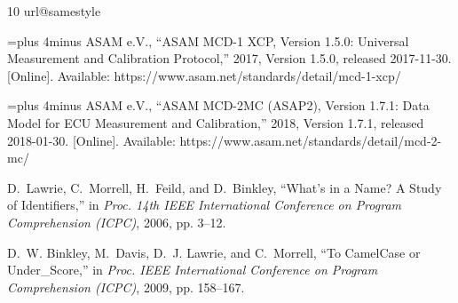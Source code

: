 \documentclass[conference]{IEEEtran}
\begin{document}
\begin{thebibliography}{10}
\providecommand{\url}[1]{#1}
\csname url@samestyle\endcsname
\providecommand{\newblock}{\relax}
\providecommand{\bibinfo}[2]{#2}
\providecommand{\BIBentrySTDinterwordspacing}{\spaceskip=0pt\relax}
\providecommand{\BIBentryALTinterwordstretchfactor}{4}
\providecommand{\BIBentryALTinterwordspacing}{\spaceskip=\fontdimen2\font plus
\BIBentryALTinterwordstretchfactor\fontdimen3\font minus
  \fontdimen4\font\relax}
\providecommand{\BIBforeignlanguage}[2]{{%
\expandafter\ifx\csname l@#1\endcsname\relax
\typeout{** WARNING: IEEEtran.bst: No hyphenation pattern has been}%
\typeout{** loaded for the language `#1'. Using the pattern for}%
\typeout{** the default language instead.}%
\else
\language=\csname l@#1\endcsname
\fi
#2}}
\providecommand{\BIBdecl}{\relax}
\BIBdecl

\BIBentryALTinterwordspacing
{ASAM e.V.}, ``{ASAM MCD-1 XCP, Version 1.5.0: Universal Measurement and
  Calibration Protocol},'' 2017, {Version} 1.5.0, released 2017-11-30.
  [Online]. Available: \url{https://www.asam.net/standards/detail/mcd-1-xcp/}
\BIBentrySTDinterwordspacing

\BIBentryALTinterwordspacing
{ASAM e.V.}, ``{ASAM MCD-2MC (ASAP2), Version 1.7.1: Data Model for ECU
  Measurement and Calibration},'' 2018, {Version} 1.7.1, released 2018-01-30.
  [Online]. Available: \url{https://www.asam.net/standards/detail/mcd-2-mc/}
\BIBentrySTDinterwordspacing

D.~Lawrie, C.~Morrell, H.~Feild, and D.~Binkley, ``{What's in a Name? A Study
  of Identifiers},'' in \emph{Proc. 14th IEEE International Conference on
  Program Comprehension (ICPC)}, 2006, pp. 3--12.

D.~W. Binkley, M.~Davis, D.~J. Lawrie, and C.~Morrell, ``{To CamelCase or
  Under\_Score},'' in \emph{Proc. IEEE International Conference on Program
  Comprehension (ICPC)}, 2009, pp. 158--167.


\end{thebibliography}
\end{document}
